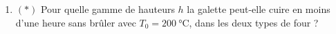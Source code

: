 \documentclass{article}
\begin{document}
\begin{enumerate}[resume]
	\item $(*)$ Pour quelle gamme de hauteurs $h$ la galette peut-elle cuire en moins d'une heure sans brûler avec $T_0 = \qty{200}{\degreeCelsius}$, dans les deux types de four ?
	
%	
%	
\end{enumerate}
\end{document}
